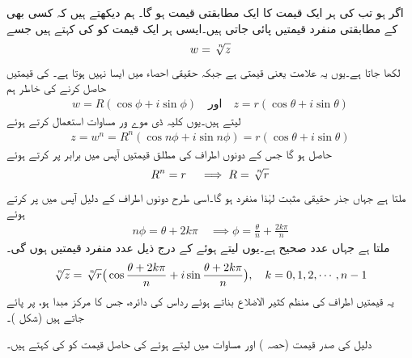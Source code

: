 اگر  ہو تب  کی ہر ایک قیمت کا ایک مطابقتی  قیمت ہو گا۔  ہم دیکھتے ہیں کہ کسی بھی  کے مطابقتی  منفرد  قیمتیں پائی جاتی ہیں۔ایسی ہر ایک قیمت کو  کی   کہتے ہیں جسے
\begin{align}
w=\sqrt[\leftroot{-2}\uproot{2}n]{z}
\end{align}
لکھا جاتا ہے۔یوں یہ علامت   یعنی  قیمتی ہے جبکہ حقیقی احصاء میں ایسا نہیں ہوتا ہے۔   کی  قیمتیں حاصل کرنے کی خاطر ہم
\begin{align*}
w=R(\cos\phi+i\sin\phi)\quad \text{اور}\quad z=r(\cos\theta+i\sin\theta)
\end{align*}
لیتے ہیں۔یوں کلیہ ڈی موے ور مساوات  استعمال کرتے ہوئے
\begin{align*}
z=w^n=R^n(\cos n\phi+i\sin n\phi)=r(\cos\theta+i\sin\theta)
\end{align*}
حاصل ہو گا جس کے دونوں اطراف کی مطلق قیمتیں آپس میں برابر پر کرتے ہوئے
\begin{align}
R^n=r\quad \implies R=\sqrt[\leftroot{-2}\uproot{2}n]{r}
\end{align}
ملتا ہے جہاں جذر حقیقی مثبت لہٰذا منفرد ہو گا۔اسی طرح دونوں اطراف کے دلیل آپس میں پر کرتے ہوئے 
\begin{align*}
n\phi=\theta+2k\pi\quad \implies \phi=\frac{\theta}{n}+\frac{2k\pi}{n}
\end{align*}
ملتا ہے جہاں  عدد صحیح ہے۔یوں  لیتے ہوئے  کے درج ذیل  عدد منفرد قیمتیں ہوں گی۔
\begin{align}\label{مساوات_مخلوط_جذر_الف}
\sqrt[\leftroot{-2}\uproot{2}n]{z}=\sqrt[\leftroot{-2}\uproot{2}n]{r}\big(\cos\frac{\theta+2k \pi}{n}+i\sin\frac{\theta+2k\pi}{n}\big),\quad k=0,1,2,\cdots,n-1
\end{align}
یہ  قیمتیں  اطراف کی منظم کثیر الاضلاع بناتے ہوئے رداس  کی دائرہ، جس کا مرکز مبدا ہو، پر پائے جاتے ہیں (شکل )۔

دلیل  کی صدر قیمت (حصہ ) اور مساوات  میں  لیتے ہوئے   کی حاصل قیمت کو  کی  کہتے ہیں۔ 

